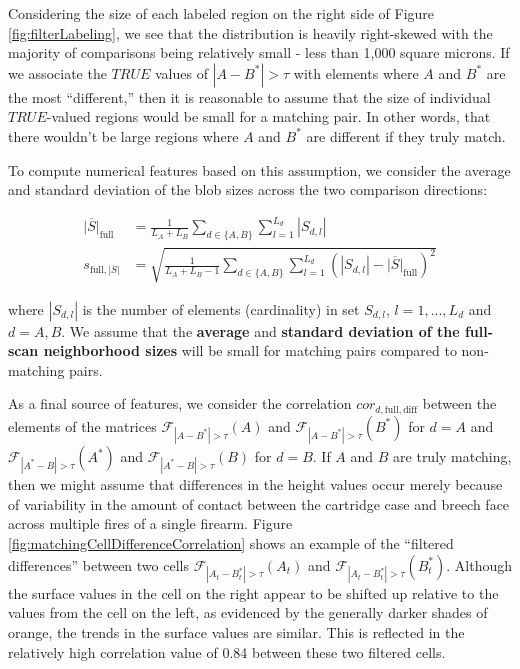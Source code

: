 \documentclass[11pt,]{isuthesis}
\begin{document}
Considering the size of each labeled region on the right side of Figure \ref{fig:filterLabeling}, we see that the distribution is heavily right-skewed with the majority of comparisons being relatively small - less than 1,000 square microns.
If we associate the \(TRUE\) values of \(|A - B^*| > \tau\) with elements where \(A\) and \(B^*\) are the most ``different,'' then it is reasonable to assume that the size of individual \(TRUE\)-valued regions would be small for a matching pair.
In other words, that there wouldn't be large regions where \(A\) and \(B^*\) are different if they truly match.

To compute numerical features based on this assumption, we consider the average and standard deviation of the blob sizes across the two comparison directions:

\begin{align*}
\overline{|S|}_{\text{full}} &= \frac{1}{L_A + L_B} \sum_{d \in \{A,B\}} \sum_{l=1}^{L_d} |S_{d,l}| \\
s_{\text{full},|S|} &= \sqrt{\frac{1}{L_A + L_B - 1} \sum_{d \in \{A,B\}} \sum_{l=1}^{L_d} (|S_{d,l}| - \overline{|S|}_{\text{full}})^2}
\end{align*}

where \(|S_{d,l}|\) is the number of elements (cardinality) in set \(S_{d,l}\), \(l = 1,...,L_d\) and \(d = A,B\).
We assume that the \textbf{average} and \textbf{standard deviation of the full-scan neighborhood sizes} will be small for matching pairs compared to non-matching pairs.

As a final source of features, we consider the correlation \(cor_{d,\text{full},\text{diff}}\) between the elements of the matrices \(\mathcal{F}_{|A - B^*| > \tau}(A)\) and \(\mathcal{F}_{|A - B^*| > \tau}(B^*)\) for \(d = A\) and \(\mathcal{F}_{|A^* - B| > \tau}(A^*)\) and \(\mathcal{F}_{|A^* - B| > \tau}(B)\) for \(d = B\).
If \(A\) and \(B\) are truly matching, then we might assume that differences in the height values occur merely because of variability in the amount of contact between the cartridge case and breech face across multiple fires of a single firearm.
Figure \ref{fig:matchingCellDifferenceCorrelation} shows an example of the ``filtered differences'' between two cells \(\mathcal{F}_{|A_t - B_t^*| > \tau}(A_t)\) and \(\mathcal{F}_{|A_t - B_t^*| > \tau}(B_t^*)\).
Although the surface values in the cell on the right appear to be shifted up relative to the values from the cell on the left, as evidenced by the generally darker shades of orange, the trends in the surface values are similar.
This is reflected in the relatively high correlation value of 0.84 between these two filtered cells.
\end{document}
